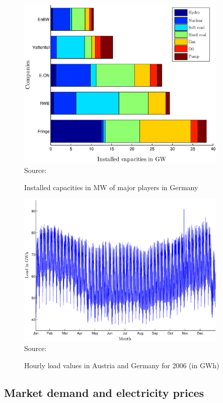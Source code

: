 \begin{figure}[htb]
  \centering
\caption{Installed capacities in MW of major players in Germany}
\includegraphics[width=0.9\textwidth]{capacities}
  \label{fig:capacities}
\\
 \scriptsize Source: \cite{Ellersdorfer2005}
\end{figure}

\begin{figure}[htb]
  \centering
\caption{Hourly load values in Austria and Germany for 2006 (in GWh)}
\includegraphics[width=0.9\textwidth]{loadvalues}
  \label{fig:capacities}
\\
 \scriptsize Source: \cite{UCTE2006}
\end{figure}
\clearpage
\subsection{Market demand and electricity prices}
\label{sec:mark-demand-electr}

